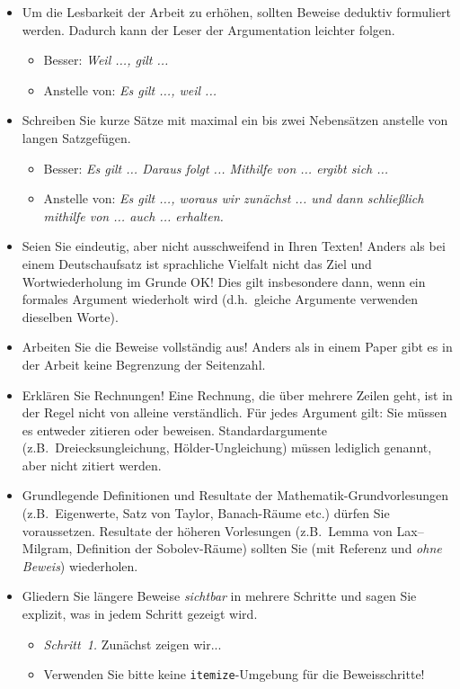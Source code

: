 \documentclass[a4paper,11pt,bibliography=totoc,listof=totoc,headinclude=true,cleardoublepage=empty,oneside]{scrbook}
\begin{document}
{\color{change}
\begin{itemize}

\item Um die Lesbarkeit der Arbeit zu erhöhen, sollten Beweise deduktiv formuliert werden. Dadurch kann der Leser der Argumentation leichter folgen.
\begin{itemize}
\item Besser: \emph{Weil ..., gilt ...} 
\item Anstelle von: \emph{Es gilt ..., weil ...}
\end{itemize}

\item Schreiben Sie kurze Sätze mit maximal ein bis zwei Nebensätzen anstelle von langen Satzgefügen.
\begin{itemize}
\item Besser: \emph{Es gilt ... Daraus folgt ... Mithilfe von ... ergibt sich ...}
\item Anstelle von: \emph{Es gilt ..., woraus wir zunächst ... und dann schließlich mithilfe von ... auch ... erhalten.}
\end{itemize}

\item Seien Sie eindeutig, aber nicht ausschweifend in Ihren Texten! Anders als bei einem Deutschaufsatz ist sprachliche Vielfalt nicht das Ziel und Wortwiederholung im Grunde OK! Dies gilt insbesondere dann, wenn ein formales Argument wiederholt wird (d.h.\ gleiche Argumente verwenden dieselben Worte).

\item Arbeiten Sie die Beweise vollständig aus! Anders als in einem Paper gibt es in der Arbeit keine Begrenzung der Seitenzahl.

\item Erklären Sie Rechnungen! Eine Rechnung, die über mehrere Zeilen geht, ist in der Regel nicht von alleine verständlich. Für jedes Argument gilt: Sie müssen es entweder zitieren oder beweisen. Standardargumente (z.B.\ Dreiecksungleichung, H\"older-Ungleichung) müssen lediglich genannt, aber nicht zitiert werden.

\item Grundlegende Definitionen und Resultate der Mathematik-Grundvorlesungen (z.B.\ Eigenwerte, Satz von Taylor, Banach-Räume etc.) dürfen Sie voraussetzen. Resultate der höheren Vorlesungen (z.B.\ Lemma von Lax--Milgram, Definition der Sobolev-Räume) sollten Sie (mit Referenz und \emph{ohne Beweis}) wiederholen.

\item Gliedern Sie längere Beweise \emph{sichtbar} in mehrere Schritte und sagen Sie explizit, was in jedem Schritt gezeigt wird.
\begin{itemize}
\item \emph{Schritt~1.} Zunächst zeigen wir...
\item Verwenden Sie bitte keine \verb$itemize$-Umgebung für die Beweisschritte!
\end{itemize}


\end{itemize}}
\end{document}
